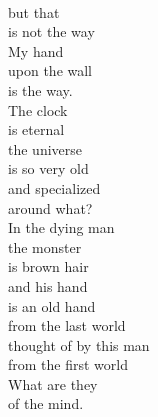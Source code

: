 \documentclass[smalldemyvopaper,11pt,twoside,onecolumn,openright,extrafontsizes]{memoir}
\begin{document}
\\but that
\\is not the way
\\My hand
\\upon the wall
\\is the way.
\\The clock
\\is eternal
\\the universe
\\is so very old
\\and specialized
\\around what?
\\In the dying man
\\the monster
\\is brown hair
\\and his hand
\\is an old hand
\\from the last world
\\thought of by this man
\\from the first world
\\What are they
\\of the mind.
\end{document}
